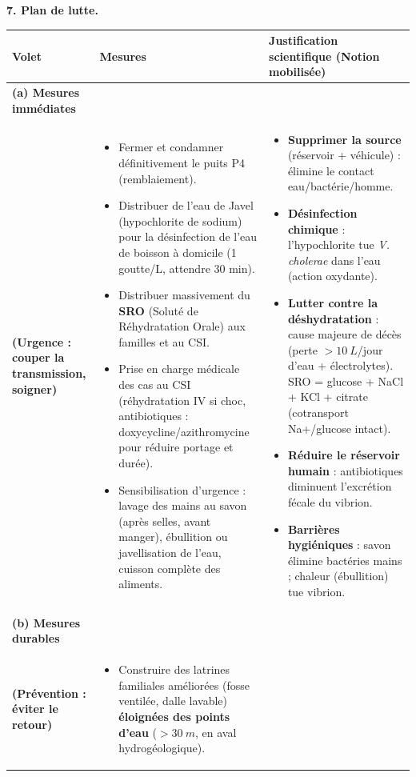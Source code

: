 \documentclass[11pt]{article}
\begin{document}
\begin{exoresolu}
\textbf{7. Plan de lutte.}

\begin{center}
\begin{tabularx}{\linewidth}{|l|X|X|}\hline
\rowcolor{popblueL} \textbf{Volet} & \textbf{Mesures} & \textbf{Justification scientifique (Notion mobilisée)} \\ \hline
\textbf{(a) Mesures immédiates}\\\textbf{(Urgence : couper la transmission, soigner)} &
\begin{itemize}
\item Fermer et condamner définitivement le puits P4 (remblaiement).
\item Distribuer de l'eau de Javel (hypochlorite de sodium) pour la désinfection de l'eau de boisson à domicile (1 goutte/L, attendre 30 min).
\item Distribuer massivement du \textbf{SRO} (Soluté de Réhydratation Orale) aux familles et au CSI.
\item Prise en charge médicale des cas au CSI (réhydratation IV si choc, antibiotiques : doxycycline/azithromycine pour réduire portage et durée).
\item Sensibilisation d'urgence : lavage des mains au savon (après selles, avant manger), ébullition ou javellisation de l'eau, cuisson complète des aliments.
\end{itemize} &
\begin{itemize}
\item \textbf{Supprimer la source} (réservoir + véhicule) : élimine le contact eau/bactérie/homme.
\item \textbf{Désinfection chimique} : l'hypochlorite tue \emph{V. cholerae} dans l'eau (action oxydante).
\item \textbf{Lutter contre la déshydratation} : cause majeure de décès (perte $> \SI{10}{L}$/jour d'eau + électrolytes). SRO = glucose + NaCl + KCl + citrate (cotransport Na+/glucose intact).
\item \textbf{Réduire le réservoir humain} : antibiotiques diminuent l'excrétion fécale du vibrion.
\item \textbf{Barrières hygiéniques} : savon élimine bactéries mains ; chaleur (ébullition) tue vibrion.
\end{itemize} \\ \hline
\textbf{(b) Mesures durables}\\\textbf{(Prévention : éviter le retour)} &
\begin{itemize}
\item Construire des latrines familiales améliorées (fosse ventilée, dalle lavable) \textbf{éloignées des points d'eau} ($> \SI{30}{m}$, en aval hydrogéologique).

\end{itemize}
\end{tabularx}
\end{center}
\end{exoresolu}
\end{document}
